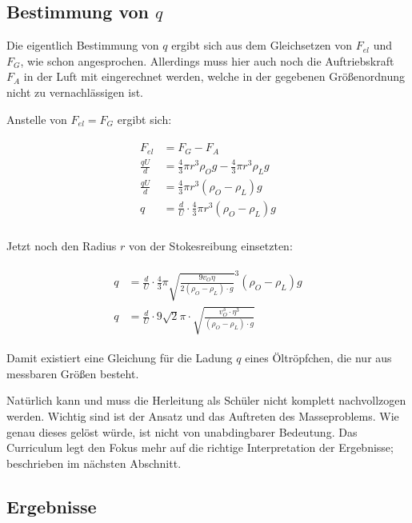\subsection{Bestimmung von $q$}

Die eigentlich Bestimmung von $q$ ergibt sich aus dem Gleichsetzen von $F_{el}$ und $F_G$, wie schon angesprochen. Allerdings muss hier auch noch die Auftriebskraft $F_A$ in der Luft mit eingerechnet werden, welche in der gegebenen Größenordnung nicht zu vernachlässigen ist.

Anstelle von $F_{el} = F_G$ ergibt sich:

\begin{align}
\begin{split}
	F_{el} &= F_G - F_A \\
	\frac{qU}{d} &= \frac{4}{3} \pi r^3 \rho_{O} g - \frac{4}{3} \pi r^3\rho_{L} g \\
	\frac{qU}{d} &= \frac{4}{3} \pi  r^3(\rho_{O} - \rho_{L}) g \\
	q &= \frac{d}{U} \cdot \frac{4}{3} \pi r^3 (\rho_{O} - \rho_{L}) g \\
\end{split}
\end{align}

\noindent Jetzt noch den Radius $r$ von der Stokesreibung einsetzten:

\begin{align}
\begin{split}
	q &= \frac{d}{U} \cdot \frac{4}{3} \pi \sqrt{\frac{9v_{O}\eta}{2(\rho_{O}-\rho_{L}) \cdot g}}^3 (\rho_{O} - \rho_{L}) g \\
	q &= \frac{d}{U} \cdot 9\sqrt{2} \pi \cdot \sqrt{\frac{v_{O}^3 \cdot \eta^3}{(\rho_O - \rho_L) \cdot g}}
\end{split}
\end{align}

Damit existiert eine Gleichung für die Ladung $q$ eines Öltröpfchen, die nur aus messbaren Größen besteht.

\begin{Anmerkung}
Natürlich kann und muss die Herleitung als Schüler nicht komplett nachvollzogen werden. Wichtig sind ist der Ansatz und das Auftreten des Masseproblems. Wie genau dieses gelöst würde, ist nicht von unabdingbarer Bedeutung. Das Curriculum legt den Fokus mehr auf die richtige Interpretation der Ergebnisse; beschrieben im nächsten Abschnitt.
\end{Anmerkung}


\subsection{Ergebnisse}

